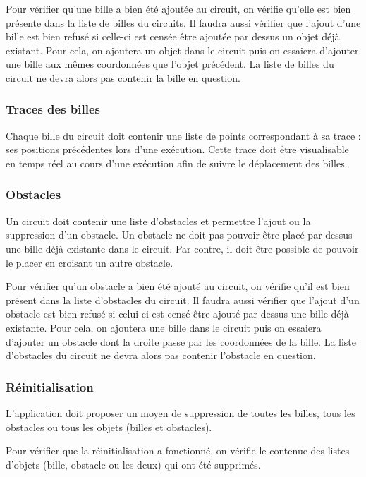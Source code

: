 \documentclass{report}
\begin{document}
Pour vérifier qu’une bille a bien été ajoutée au circuit, on vérifie qu’elle est bien présente dans la liste de billes du circuits. Il faudra aussi vérifier que l’ajout d’une bille est bien refusé si celle-ci est censée être ajoutée par dessus un objet déjà existant. Pour cela, on ajoutera un objet dans le circuit puis on essaiera d’ajouter une bille aux mêmes coordonnées que l’objet précédent. La liste de billes du circuit ne devra alors pas contenir la bille en question.

\subsubsection{Traces des billes}

Chaque bille du circuit doit contenir une liste de points correspondant à sa trace : ses positions précédentes lors d’une exécution. Cette trace doit être visualisable en temps réel au cours d’une exécution afin de suivre le déplacement des billes.


\subsubsection{Obstacles}

Un circuit doit contenir une liste d’obstacles et permettre l’ajout ou la suppression d’un obstacle. Un obstacle ne doit pas pouvoir être placé par-dessus une bille déjà existante dans le circuit. Par contre, il doit être possible de pouvoir le placer en croisant un autre obstacle.

Pour vérifier qu’un obstacle a bien été ajouté au circuit, on vérifie qu’il est bien présent dans la liste d’obstacles du circuit. Il faudra aussi vérifier que l’ajout d’un obstacle est bien refusé si celui-ci est censé être ajouté par-dessus une bille déjà existante. Pour cela, on ajoutera une bille dans le circuit puis on essaiera d’ajouter un obstacle dont la droite passe par les coordonnées de la bille. La liste d’obstacles du circuit ne devra alors pas contenir l’obstacle en question.


\subsubsection{Réinitialisation}

L’application doit proposer un moyen de suppression de toutes les billes, tous les obstacles ou tous les objets (billes et obstacles).

Pour vérifier que la réinitialisation a fonctionné, on vérifie le contenue des listes d’objets (bille, obstacle ou les deux) qui ont été supprimés.
\end{document}
